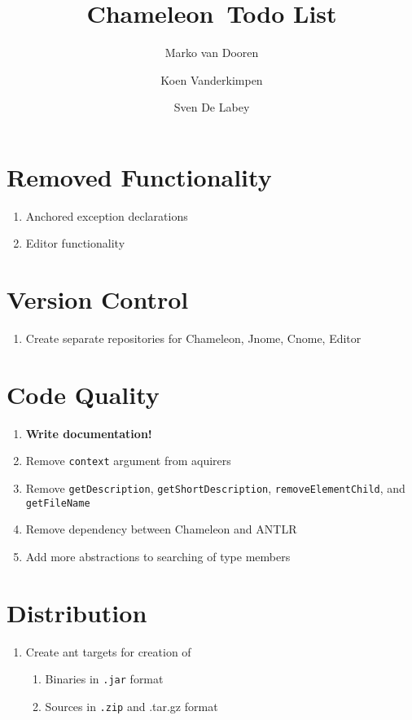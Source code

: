 \documentclass{article}
\begin{document}
\newcommand{\cham}{Chameleon}
\newcommand{\code}[1]{\texttt{#1}}

\title{\cham\ Todo List}
\author{Marko van Dooren \and Koen Vanderkimpen \and Sven De Labey}
\maketitle

\section{Removed Functionality}
\begin{enumerate}
\item Anchored exception declarations
\item Editor functionality
\end{enumerate}

\section{Version Control}
\begin{enumerate}
\item Create separate repositories for Chameleon, Jnome, Cnome, Editor
\end{enumerate}

\section{Code Quality}
\begin{enumerate}
\item \textbf{Write documentation!}
\item Remove \code{context} argument from aquirers
\item Remove \code{getDescription}, \code{getShortDescription}, \code{removeElementChild}, and \code{getFileName}
\item Remove dependency between Chameleon and ANTLR
\item Add more abstractions to searching of type members
\end{enumerate}

\section{Distribution}
\begin{enumerate}
\item Create ant targets for creation of
\begin{enumerate}
\item Binaries in \code{.jar} format
\item Sources in \code{.zip} and {.tar.gz} format
\end{enumerate}
\end{enumerate}
\end{document}
